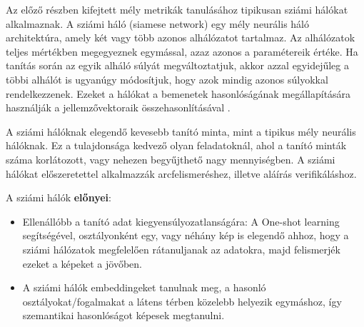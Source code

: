 Az előző részben kifejtett mély metrikák tanulásához tipikusan sziámi hálókat alkalmaznak. A sziámi háló (siamese network) egy mély neurális háló architektúra, amely két vagy több azonos alhálózatot tartalmaz. Az alhálózatok teljes mértékben megegyeznek egymással, azaz azonos a paramétereik értéke. Ha tanítás során az egyik alháló súlyát megváltoztatjuk, akkor azzal egyidejűleg a többi alhálót is ugyanúgy módosítjuk, hogy azok mindig azonos súlyokkal rendelkezzenek. Ezeket a hálókat a bemenetek hasonlóságának megállapítására használják a jellemzővektoraik összehasonlításával \cite{bromley1993siamese}. 

A sziámi hálóknak elegendő kevesebb tanító minta, mint a tipikus mély neurális hálóknak. Ez a tulajdonsága kedvező olyan feladatoknál, ahol a tanító minták száma korlátozott, vagy nehezen begyűjthető nagy mennyiségben. A sziámi hálókat előszeretettel alkalmazzák arcfelismeréshez, illetve aláírás verifikáláshoz.

A sziámi hálók \textbf{előnyei}:
\begin{itemize}
	\item Ellenállóbb a tanító adat kiegyensúlyozatlanságára: A One-shot learning segítségével, osztályonként egy, vagy néhány kép is elegendő ahhoz, hogy a sziámi hálózatok megfelelően rátanuljanak az adatokra, majd felismerjék ezeket a képeket a jövőben.
	\item A sziámi hálók embeddingeket tanulnak meg, a hasonló osztályokat/fogalmakat a látens térben közelebb helyezik egymáshoz, így szemantikai hasonlóságot képesek megtanulni.
\end{itemize}





